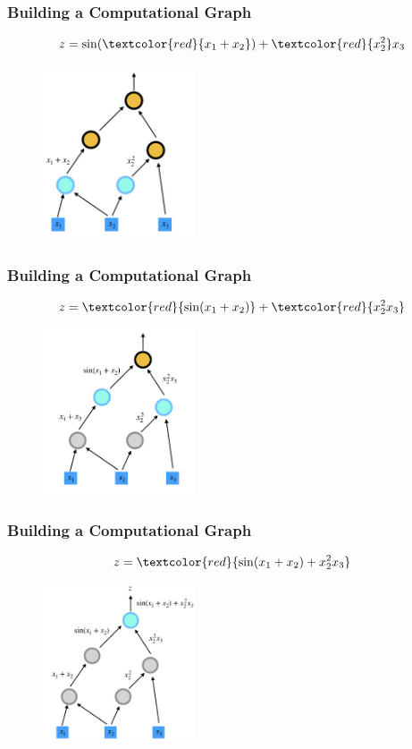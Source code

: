 \documentclass{beamer}
\newcommand{\red}[1]{\textcolor{red}{#1}}
\begin{document}
\begin{frame}
	\frametitle{Building a Computational Graph}

	$$z=\sin(\red{x_1+x_2}) + \red{x_2^2}x_3$$

	\begin{figure}[hbt]
		\includegraphics[width=0.4\textwidth]{figures/fd1}
	\end{figure}


\end{frame}


\begin{frame}
	\frametitle{Building a Computational Graph}

	$$z=\red{\sin(x_1+x_2)} + \red{x_2^2x_3}$$

	\begin{figure}[hbt]
		\includegraphics[width=0.4\textwidth]{figures/fd2}
	\end{figure}
\end{frame}

\begin{frame}
	\frametitle{Building a Computational Graph}

	$$z=\red{\sin(x_1+x_2) + x_2^2x_3}$$

	\begin{figure}[hbt]
		\includegraphics[width=0.4\textwidth]{figures/fd3}
	\end{figure}
\end{frame}
\end{document}
